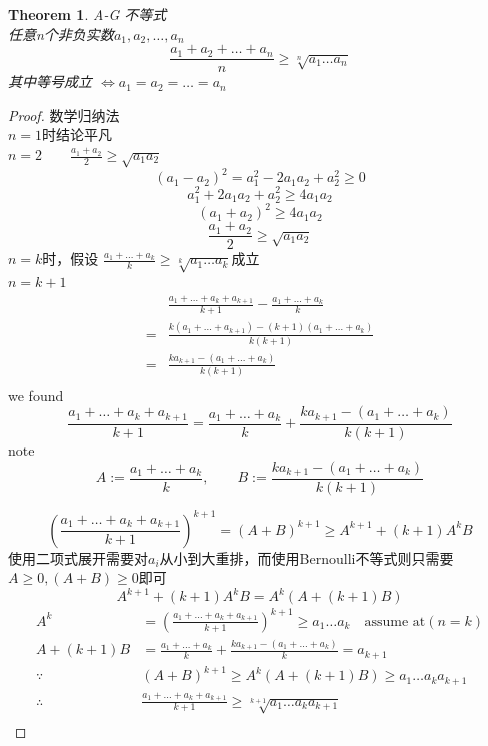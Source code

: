 \documentclass[10pt,a4paper]{book}
\newtheorem{theorem}{Theorem}[section]
\begin{document}
	\begin{theorem}
	A-G 不等式\\ 任意n个非负实数$ a_1, a_2, \dots, a_n$ \\
	\begin{equation}
		\frac{a_1 + a_2 + \dots + a_n}{n} \geq \sqrt[n]{a_1\dots a_n}
	\end{equation}
	其中等号成立 $\iff a_1 = a_2 = \dots = a_n$

	\label{thm-1}
	\end{theorem}

	\begin{proof}\label{1}
	数学归纳法\\ $n=1$时结论平凡\\
	$n=2\qquad \frac{a_1+a_2}{2} \geq \sqrt{a_1a_2}$\\
	\[(a_1 - a_2)^2 = a_1^2 - 2 a_1 a_2 + a_2^2 \geq 0 \]
	\[a_1^2 + 2a_1a_2 + a_2^2 \geq 4a_1a_2\]
	\[(a_1+a_2)^2\geq 4a_1a_2\]
	\[\frac{a_1+a_2}{2}\geq \sqrt{a_1a_2}\]
	$n=k$时，假设 $\frac{a_1+\dots+a_k}{k}\geq \sqrt[k]{a_1\dots a_k}$成立\\
	$ n=k+1 $
	\begin{equation}
	\begin{aligned}
		&\frac{a_1+\dots + a_k + a_{k+1}}{k+1}-\frac{a_1+\dots +a_k}{k} \\
		=&\frac{k(a_1+\dots+a_{k+1})-(k+1)(a_1+\dots+a_k)}{k(k+1)}\\
		=&\frac{ka_{k+1}-(a_1+\dots+a_k)}{k(k+1)}\\		
	\end{aligned}
	\end{equation}
	we found 
	\[\frac{a_1+\dots + a_k + a_{k+1}}{k+1} =  \frac{a_1+\dots + a_k}{k} + \frac{ka_{k+1}-(a_1+\dots + a_k)}{k(k+1)} \]
	note \[ A := \frac{a_1+\dots + a_k}{k} , \qquad B:=\frac{ka_{k+1}-(a_1+\dots + a_k)}{k(k+1)}\]
	
	\begin{equation}
		(\frac{a_1+\dots + a_k + a_{k+1}}{k+1})^{k+1}=(A+B)^{k+1}\geq A^{k+1}+(k+1)A^k B
	\end{equation}
	使用二项式展开需要对$ a_i $从小到大重排，而使用Bernoulli不等式则只需要$ A\geq 0, (A+B)\geq 0 $即可
	\begin{equation}
		A^{k+1}+(k+1)A^k B = A^k(A+(k+1)B)
	\end{equation}
	\begin{equation}
		\begin{aligned}
			A^k& =	(\frac{a_1+\dots + a_k + a_{k+1}}{k+1})^{k+1} \geq a_1\dots a_k \quad \text{assume at}(n=k)\\
			A+(k+1)B&= \frac{a_1+\dots + a_k}{k} + \frac{ka_{k+1}-(a_1+\dots + a_k)}{k} = a_{k+1}\\
			\because& (A+B)^{k+1}\geq A^k(A+(k+1)B)\geq a_1 \dots a_k  a_{k+1}\\
			\therefore & 	\frac{a_1+\dots + a_k + a_{k+1}}{k+1} \geq  \sqrt[k+1]{a_1 \dots a_k  a_{k+1}}\\
		\end{aligned}
	\end{equation}
	

\end{proof}
\end{document}
